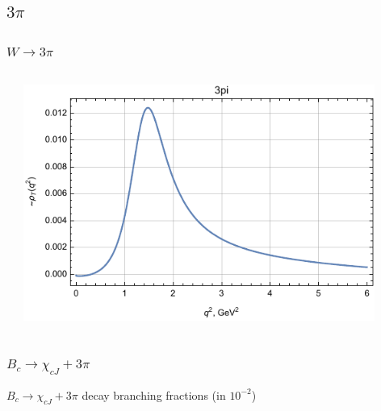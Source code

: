 \documentclass{beamer}
\begin{document}
\subsection{$3\pi$}
\begin{frame}
  \frametitle{$W \to  3\pi$}
  \begin{columns}
    \begin{column}{0.5\textwidth}
    \end{column}
    \begin{column}{0.5\textwidth}
  \includegraphics[width=0.9\textwidth]{figs/rhoT_3pi_q2}
    \end{column}
  \end{columns}
\end{frame}

\begin{frame}
  \frametitle{$B_c \to \chi_{cJ} + 3\pi$}

  $B_c \to \chi_{cJ} + 3\pi$ decay branching fractions (in $10^{-2}$) 

  
\end{frame}
\end{document}
